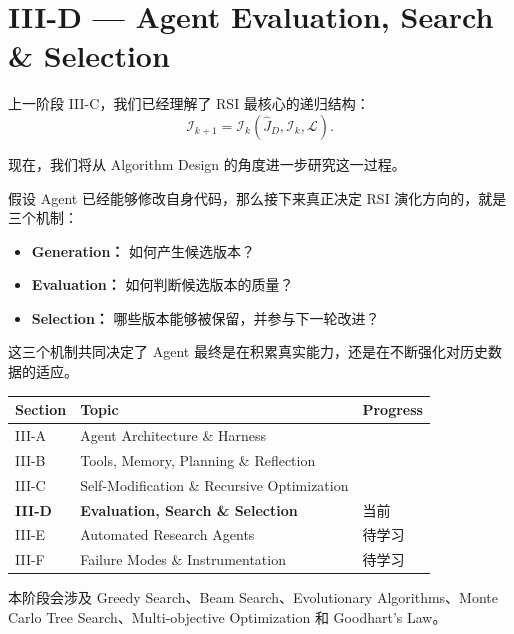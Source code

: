 \hypertarget{part-3-40-0001-iii-d-agent-evaluation-search-selection}{%
\section{III-D --- Agent Evaluation, Search \& Selection}\label{part-3-40-0001-iii-d-agent-evaluation-search-selection}}

上一阶段 III-C，我们已经理解了 RSI 最核心的递归结构：
\[\mathcal I_{k+1}
=
\mathcal I_k
(\widehat J_D,\mathcal I_k,\mathcal L).\]

现在，我们将从 Algorithm Design 的角度进一步研究这一过程。

假设 Agent 已经能够修改自身代码，那么接下来真正决定 RSI 演化方向的，就是三个机制：

\begin{itemize}
\tightlist
\item
  \textbf{Generation：} 如何产生候选版本？
\item
  \textbf{Evaluation：} 如何判断候选版本的质量？
\item
  \textbf{Selection：} 哪些版本能够被保留，并参与下一轮改进？
\end{itemize}

这三个机制共同决定了 Agent 最终是在积累真实能力，还是在不断强化对历史数据的适应。

\begin{readertable}
\begin{longtable}[]{@{}
  >{\raggedright\arraybackslash}p{}
  >{\raggedright\arraybackslash}p{}
  >{\raggedright\arraybackslash}p{}@{}}
\toprule
Section & Topic & Progress \\
\midrule
\endhead
III-A & Agent Architecture \& Harness & \\
III-B & Tools, Memory, Planning \& Reflection & \\
III-C & Self-Modification \& Recursive Optimization & \\
\textbf{III-D} & \textbf{Evaluation, Search \& Selection} & 当前 \\
III-E & Automated Research Agents & 待学习 \\
III-F & Failure Modes \& Instrumentation & 待学习 \\
\bottomrule
\end{longtable}
\end{readertable}

本阶段会涉及 Greedy Search、Beam Search、Evolutionary Algorithms、Monte Carlo Tree Search、Multi-objective Optimization 和 Goodhart's Law。

